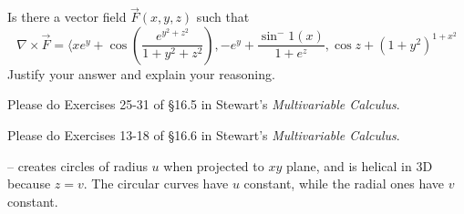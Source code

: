 \documentclass[12pt]{exam}
\begin{document}
\begin{questions}

\question Is there a vector field $\overrightarrow{F}(x, y, z)$ such that
    \[\nabla \times \overrightarrow{F} = \langle xe^y + \cos\left(\frac{e^{y^2 + z^2}}{1 + y^2 + z^2}\right), -e^y + \frac{\sin^-1(x)}{1+e^z}, \cos z + (1 + y^2)^{1+x^2} \]
    Justify your answer and explain your reasoning.

\question Please do Exercises 25-31 of §16.5 in Stewart's \textit{Multivariable Calculus}.

\question Please do Exercises 13-18 of §16.6 in Stewart’s \textit{Multivariable Calculus}.
    \begin{solution}
        \setcounter{question}{12}
        \begin{questions}
            \question {} -- creates circles of radius $u$ when projected to $xy$ plane, and is helical in 3D because $z = v$. The circular curves have $u$ constant, while the radial ones have $v$ constant.
            \question \boxed{}
        \end{questions}
    \end{solution}


\end{questions}
\end{document}

